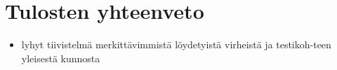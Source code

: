\section{Tulosten yhteenveto}

\begin{itemize}
	\item lyhyt tiivistelmä merkittävimmistä löydetyistä virheistä ja testikoh-teen yleisestä kunnosta
\end{itemize}